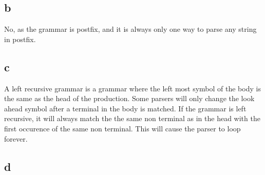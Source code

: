 \documentclass{article}
\begin{document}
\subsection*{b}
No, as the grammar is postfix, and it is always only one way to parse any string in postfix.

\subsection*{c}
A left recursive grammar is a grammar where the left most symbol of the body is the same as 
the head of the production. Some parsers will only change the look ahead symbol after a terminal
in the body is matched. If the grammar is left recursive, it will always match the the same non 
terminal as in the head with the first occurence of the same non terminal. This will cause the
parser to loop forever.

\subsection*{d}
\end{document}
